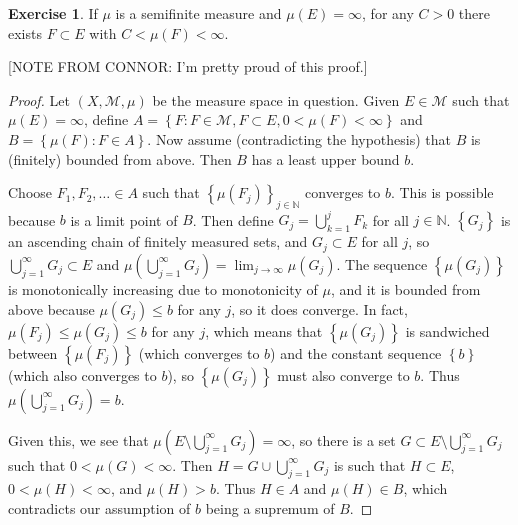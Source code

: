 \documentclass{article}
\theoremstyle{definition}
\newtheorem{ex}{Exercise}
\begin{document}
\begin{ex}
	If $\mu$ is a semifinite measure and $\mu(E) = \infty$, for any $C > 0$ there exists $F \subset E$ with $C < \mu(F) < \infty$.

		[NOTE FROM CONNOR: I'm pretty proud of this proof.]
\end{ex}
\begin{proof}
	Let $(X, \mathscr{M}, \mu)$ be the measure space in question.
	Given $E \in \mathscr{M}$ such that $\mu(E) = \infty$, define $A = \left\lbrace F : F \in \mathscr{M}, F \subset E, 0 < \mu(F) < \infty \right\rbrace$ and $B = \left\lbrace \mu(F) : F \in A \right\rbrace$.
	Now assume (contradicting the hypothesis) that $B$ is (finitely) bounded from above.
	Then $B$ has a least upper bound $b$.

	Choose $F_1, F_2, \dots \in A$ such that $\left\lbrace \mu(F_j) \right\rbrace_{j \in \mathbb{N}}$ converges to $b$.
	This is possible because $b$ is a limit point of $B$.
	Then define $G_j = \bigcup_{k = 1}^{j} F_k$ for all $j \in \mathbb{N}$.
	$\left\lbrace G_j \right\rbrace$ is an ascending chain of finitely measured sets, and $G_j \subset E$ for all $j$, so $\bigcup_{j = 1}^\infty G_j \subset E$ and $\mu \left( \bigcup_{j = 1}^{\infty}G_j \right) = \lim_{j \to \infty} \mu(G_j)$.
	The sequence $\left\lbrace \mu(G_j) \right\rbrace$ is monotonically increasing due to monotonicity of $\mu$, and it is bounded from above because $\mu(G_j) \leq b$ for any $j$, so it does converge.
	In fact, $\mu(F_j) \leq \mu(G_j) \leq b$ for any $j$, which means that $\left\lbrace \mu(G_j) \right\rbrace$ is sandwiched between $\left\lbrace \mu(F_j) \right\rbrace$ (which converges to $b$) and the constant sequence $\left\lbrace b \right\rbrace$ (which also converges to $b$), so $\left\lbrace \mu(G_j) \right\rbrace$ must also converge to $b$.
	Thus $\mu \left( \bigcup_{j = 1}^{\infty} G_j \right) = b$.

	Given this, we see that $\mu \left( E \setminus \bigcup_{j = 1}^{\infty} G_j \right) = \infty$, so there is a set $G \subset E \setminus \bigcup_{j = 1}^\infty G_j $ such that $0 < \mu(G) < \infty$.
	Then $H = G \cup \bigcup_{j = 1}^\infty G_j$ is such that $H \subset E$, $0 < \mu(H) < \infty$, and $\mu(H) > b$.
	Thus $H \in A$ and $\mu(H) \in B$, which contradicts our assumption of $b$ being a supremum of $B$.
\end{proof}
\end{document}
